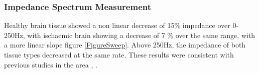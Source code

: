 \subsubsection{Impedance Spectrum Measurement}

Healthy brain tissue showed a non linear decrease of 15\% impedance over 0-250Hz, with ischaemic brain showing a decrease of 7 \% over the same range, with a more linear slope figure \ref{FigureSweep}. Above 250Hz, the impedance of both tissue types decreased at the same rate. These results were consistent with previous studies in the area \cite{Ranck_1963}, \cite{Logothetis_2007}.